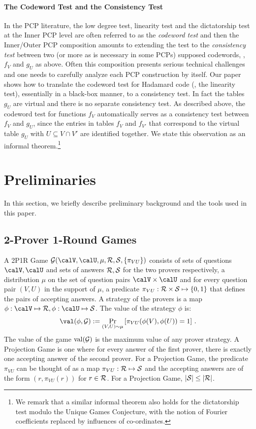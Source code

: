 \paragraph{The Codeword Test and the Consistency Test} In the PCP
literature, the low degree test, linearity test and the dictatorship test at the
Inner PCP level
are
often referred to as the \emph{codeword test} and then the Inner/Outer PCP composition
amounts to extending the test to the \emph{consistency test}
between two (or more as is necessary in some PCPs)
supposed codewords, \eg, $f_V$ and $g_U$ as above. Often this composition
presents serious technical challenges and one needs to carefully analyze
each PCP construction by itself. Our paper shows how to translate
the codeword test for Hadamard code (\ie, the linearity test), essentially in a
black-box manner, to a consistency test. In fact the tables $g_U$ are
virtual and there is no separate
consistency test. As described above, the codeword test for functions $f_V$
automatically serves as a consistency test between $f_V$ and $g_U$, since the
entries in tables
$f_V$ and  $f_{V'}$ that correspond to
the virtual table $g_U$ with $U \subseteq V \cap V'$
are identified together. We state this observation as an informal theorem.\footnote{We remark that a similar informal theorem also holds for the dictatorship test
modulo the Unique Games Conjecture, with the notion of Fourier coefficients replaced
by influences of co-ordinates.}

\section{Preliminaries}
In this section, we briefly describe preliminary background and the tools used in this paper.

\subsection{2-Prover 1-Round Games}

\begin{definition} \label{def:2p1r} A 2P1R Game ${\cal G}(\calV, \calU, \mu, {\cal R}, {\cal S},
\{ \pi_{VU}\} )$ consists of sets of questions $\calV, \calU$ and
sets of answers ${\cal R}, {\cal S}$ for the two provers
respectively, a distribution $\mu$ on the set of question pairs
$\calV \times \calU$ and for every question pair $(V,U)$ in the
support of $\mu$, a predicate $\pi_{VU}: {\cal R} \times {\cal S}
\mapsto \{0,1\}$ that defines the pairs of accepting answers.
A strategy of the %
provers is a map $\phi: \calV
\mapsto {\cal R}, \phi: \calU \mapsto {\cal S}$. The value of the
strategy $\phi$ is:
\[
  \val(\phi, {\cal G}) := \Pr_{(V,U) \sim \mu} \left[ \pi_{VU} (
  \phi(V), \phi(U) ) =1
 \right]\,.
\]
The value of the game ${\rm val}({\cal G})$ is the maximum value of
any prover strategy. A Projection Game is one where for every answer
of the first prover, there is exactly one accepting answer of the
second prover. For a Projection Game, the predicate $\pi_{VU}$ can
be thought of as a map $\pi_{VU}: {\cal R} \mapsto {\cal S}$ and
the accepting answers are of the form $(r, \pi_{VU}(r))$ for $r \in {\cal R}$.
For a Projection Game, $|{\cal S}| \leq |{\cal R}|$.
\end{definition}

